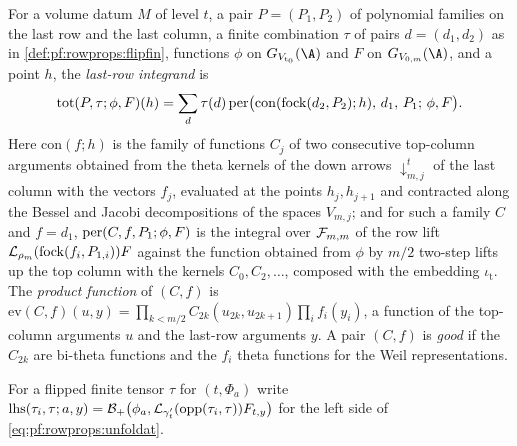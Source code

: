 \begin{definition}\label{def:pf:rowprops:tot}
For a volume datum $M$ of level $t$, a pair $P=(P_1,P_2)$ of polynomial families on the last row and the last column, a
finite combination $\tau$ of pairs $d=(d_1,d_2)$ as in \cref{def:pf:rowprops:flipfin}, functions $\phi$ on
$G_{V_{\mathrm t_0}}(\A)$ and $F$ on $G_{V_{0,m}}(\A)$, and a point $h$, the \emph{last-row integrand} is
\[
\mathrm{tot}(P,\tau;\phi,F)(h)=\sum_d\tau(d)\,\mathrm{per}\bigl(\mathrm{con}(\mathrm{fock}(d_2,P_2);h),\,d_1,\,P_1;\,\phi,F\bigr).
\]
Here $\mathrm{con}(f;h)$ is the family of functions $C_j$ of two consecutive top-column arguments obtained from the theta
kernels of the down arrows $\downarrow^t_{m,j}$ of the last column with the vectors $f_j$, evaluated at the points
$h_j,h_{j+1}$ and contracted along the Bessel and Jacobi decompositions of the spaces $V_{m,j}$; and for such a family
$C$ and $f=d_1$, $\mathrm{per}(C,f,P_1;\phi,F)$ is the integral over $\mathcal{F}_{m,m}$ of the row lift
$\mathcal{L}_{\rho_m}(\mathrm{fock}(f_i,P_{1,i}))F$ against the function obtained from $\phi$ by $m/2$ two-step lifts up the
top column with the kernels $C_0,C_2,\dots$, composed with the embedding $\iota_{\mathrm t}$. The \emph{product function}
of $(C,f)$ is $\mathrm{ev}(C,f)(u,y)=\prod_{k<m/2}C_{2k}(u_{2k},u_{2k+1})\prod_if_i(y_i)$, a function of the top-column
arguments $u$ and the last-row arguments $y$. A pair $(C,f)$ is \emph{good} if the $C_{2k}$ are bi-theta functions and the
$f_i$ theta functions for the Weil representations.
\end{definition}

For a flipped finite tensor $\tau$ for $(t,\Phi_a)$ write
$\mathrm{lhs}(\tau_i,\tau;a,y)=\mathcal{B}_+\bigl(\phi_a,\mathcal{L}_{\gamma'_t}(\mathrm{opp}(\tau_i,\tau))F_{t,y}\bigr)$ for
the left side of \eqref{eq:pf:rowprops:unfoldat}.

